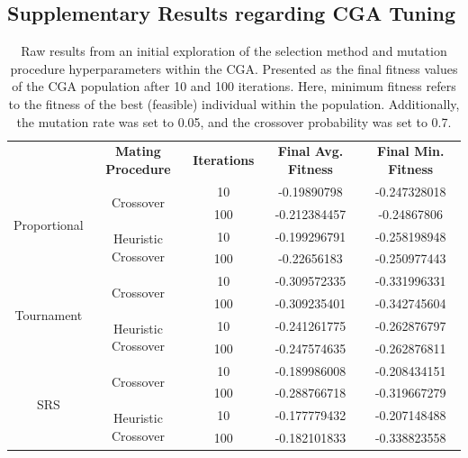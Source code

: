 \documentclass[10pt]{article}
\begin{document}
\subsection{Supplementary Results regarding CGA Tuning}
\label{sec:CGA_tuning_results}
\begin{table}[H]
    \centering
    \begin{tabular}{|*{5}{c|}}
        \hline
        \renewcommand{\arraystretch}{1.5}
        \multirow{2}{*}{\textbf{Selection Method}} & \multirow{2}{*}{\textbf{Mating Procedure}} & \multirow{2}{*}{\textbf{Iterations}} & \multirow{2}{*}{\textbf{Final Avg. Fitness}} & \multirow{2}{*}{\textbf{Final Min. Fitness}} \\
        & & & & \\
        \hline
        \multirow{4}{*}{Proportional} & \multirow{2}{*}{Crossover} & 10 & -0.19890798 & -0.247328018 \\
        & &\cellcolor{lightgray} 100 &\cellcolor{lightgray} -0.212384457 &\cellcolor{lightgray} -0.24867806 \\
        \cline{2-5}
        & \multirow{2}{*}{Heuristic Crossover} & 10 & -0.199296791 & -0.258198948 \\
        & &\cellcolor{lightgray} 100 &\cellcolor{lightgray} -0.22656183 & \cellcolor{lightgray} -0.250977443 \\
        \hline
        \multirow{4}{*}{Tournament} & \multirow{2}{*}{Crossover} & 10 & -0.309572335 & -0.331996331 \\
        & &\cellcolor{lightgray} 100 &\cellcolor{lightgray} -0.309235401 &\cellcolor{lightgray} -0.342745604 \\
        \cline{2-5}
        & \multirow{2}{*}{Heuristic Crossover} & 10 & -0.241261775 & -0.262876797 \\
        & &\cellcolor{lightgray} 100 &\cellcolor{lightgray} -0.247574635 &\cellcolor{lightgray} -0.262876811 \\
        \hline
        \multirow{4}{*}{SRS} & \multirow{2}{*}{Crossover} & 10 & -0.189986008 & -0.208434151 \\
        & &\cellcolor{lightgray} 100 &\cellcolor{lightgray} -0.288766718 &\cellcolor{lightgray} -0.319667279 \\
        \cline{2-5}
        & \multirow{2}{*}{Heuristic Crossover} & 10 & -0.177779432 & -0.207148488 \\
        & &\cellcolor{lightgray} 100 &\cellcolor{lightgray} -0.182101833 &\cellcolor{lightgray} -0.338823558 \\
        \hline
    \end{tabular}
    \captionsetup{justification=centering}
    \caption{Raw results from an initial exploration of the selection method and mutation procedure hyperparameters within the CGA. Presented as the final fitness values of the CGA population after 10 and 100 iterations. Here, minimum fitness refers to the fitness of the best (feasible) individual within the population. Additionally, the mutation rate was set to 0.05, and the crossover probability was set to 0.7.}
    \label{tab:CGAexploration}
\end{table}
\end{document}
